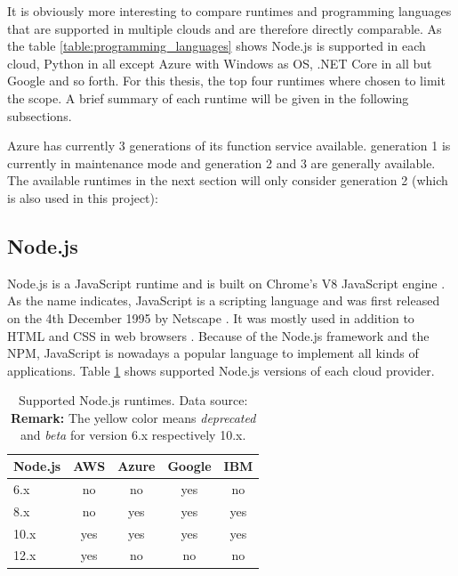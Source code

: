 It is obviously more interesting to compare runtimes and programming languages that are supported in multiple clouds and are therefore directly comparable. As the table \ref{table:programming_languages} shows Node.js is supported in each cloud, Python in all except Azure with Windows as \gls{OS}, .NET Core in all but Google and so forth. For this thesis, the top four runtimes where chosen to limit the scope. A brief summary of each runtime will be given in the following subsections.
\begin{remark}
Azure has currently 3 generations of its function service available. generation 1 is currently in maintenance mode and generation 2 and 3 are generally available. The available runtimes in the next section will only consider generation 2 (which is also used in this project):
\end{remark}

\subsection{Node.js}

Node.js is a JavaScript runtime and is built on Chrome's V8 JavaScript engine \cite{Nodejs}. As the name indicates, JavaScript is a scripting language and was first released on the 4th December 1995 by Netscape \cite{JavaScript}. It was mostly used in addition to \gls{HTML} and \gls{CSS} in web browsers \cite{JavaScript}. Because of the Node.js framework and the \gls{NPM}, JavaScript is nowadays a popular language to implement all kinds of applications. Table \ref{table:nodejs} shows supported Node.js versions of each cloud provider. 

\begin{table}[htp]
\centering
\captionsetup[table]{justification=centering, labelfont=bf}
\begin{tabular}{|l|c|c|c|c|} 
 \hline
 Node.js & AWS & Azure & Google & IBM \\ \hline
6.x  & \cellcolor{red!25}no    & \cellcolor{red!25}no    & \cellcolor{yellow!25}yes  & \cellcolor{red!25}no\\ \hline
8.x  & \cellcolor{red!25}no & \cellcolor{green!25}yes & \cellcolor{green!25}yes   & \cellcolor{green!25}yes \\ \hline
10.x & \cellcolor{green!25}yes & \cellcolor{green!25}yes & \cellcolor{yellow!25}yes  & \cellcolor{green!25}yes \\ \hline
12.x & \cellcolor{green!25}yes & \cellcolor{red!25}no & \cellcolor{red!25}no & \cellcolor{red!25}no \\ \hline
\end{tabular}
\caption[Supported Node.js runtimes]{Supported Node.js runtimes. Data source: \cite{AWSLambdaLanguages, AzureFunctionsLanguages, GoogleFunctionsLanguages, IBMRuntimes}\\ \textbf{Remark:} The yellow color means \textit{deprecated} and \textit{beta} for version 6.x respectively 10.x.}
\label{table:nodejs}
\end{table}

